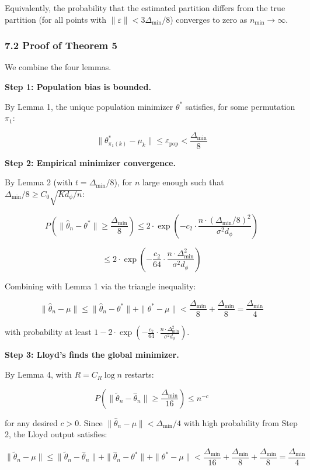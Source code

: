 \documentclass[
  12pt,
]{ctexart}
\begin{document}
Equivalently, the probability that the estimated partition differs from
the true partition (for all points with
\(\|\varepsilon\| < 3\Delta_{\min}/8\)) converges to zero as
\(n_{\min} \to \infty\).

\subsubsection{7.2 Proof of Theorem 5}\label{proof-of-theorem-5}

We combine the four lemmas.

\textbf{Step 1: Population bias is bounded.}

By Lemma 1, the unique population minimizer \(\theta^*\) satisfies, for
some permutation \(\pi_1\):

\[\|\theta^*_{\pi_1(k)} - \mu_k\| \leq \varepsilon_{\text{pop}} < \frac{\Delta_{\min}}{8}\]

\textbf{Step 2: Empirical minimizer convergence.}

By Lemma 2 (with \(t = \Delta_{\min}/8\)), for \(n\) large enough such
that \(\Delta_{\min}/8 \geq C_0\sqrt{K d_\phi / n}\):

\[P\left(\|\hat{\theta}_n - \theta^*\| \geq \frac{\Delta_{\min}}{8}\right) \leq 2 \cdot \exp\left(-c_2 \cdot \frac{n \cdot (\Delta_{\min}/8)^2}{\sigma^2 d_\phi}\right)\]

\[\leq 2 \cdot \exp\left(-\frac{c_2}{64} \cdot \frac{n \cdot \Delta_{\min}^2}{\sigma^2 d_\phi}\right)\]

Combining with Lemma 1 via the triangle inequality:

\[\|\hat{\theta}_n - \mu\| \leq \|\hat{\theta}_n - \theta^*\| + \|\theta^* - \mu\| < \frac{\Delta_{\min}}{8} + \frac{\Delta_{\min}}{8} = \frac{\Delta_{\min}}{4}\]

with probability at least
\(1 - 2 \cdot \exp\left(-\frac{c_2}{64} \cdot \frac{n \cdot \Delta_{\min}^2}{\sigma^2 d_\phi}\right)\).

\textbf{Step 3: Lloyd's finds the global minimizer.}

By Lemma 4, with \(R = C_R \log n\) restarts:

\[P\left(\|\tilde{\theta}_n - \hat{\theta}_n\| \geq \frac{\Delta_{\min}}{16}\right) \leq n^{-c}\]

for any desired \(c > 0\). Since
\(\|\hat{\theta}_n - \mu\| < \Delta_{\min}/4\) with high probability
from Step 2, the Lloyd output satisfies:

\[\|\tilde{\theta}_n - \mu\| \leq \|\tilde{\theta}_n - \hat{\theta}_n\| + \|\hat{\theta}_n - \theta^*\| + \|\theta^* - \mu\| < \frac{\Delta_{\min}}{16} + \frac{\Delta_{\min}}{8} + \frac{\Delta_{\min}}{8} = \frac{\Delta_{\min}}{4}\]
\end{document}
